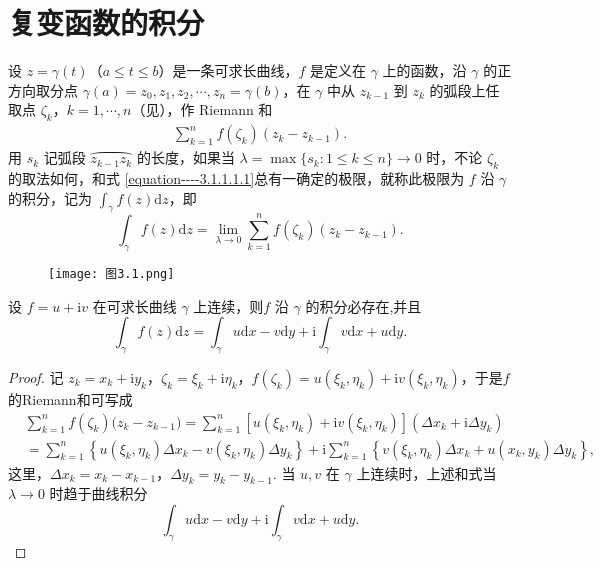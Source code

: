 \documentclass[../../main.tex]{subfiles}
\begin{document}
\section{复变函数的积分}

\begin{definition}
设 \( z = \gamma(t) \)（\( a \leqslant t \leqslant b \)）是一条可求长曲线，\( f \) 是定义在 \( \gamma \) 上的函数，沿 \( \gamma \) 的正方向取分点 \( \gamma(a) = z_0, z_1, z_2, \cdots, z_n = \gamma(b) \)，在 \( \gamma \) 中从 \( z_{k - 1} \) 到 \( z_k \) 的弧段上任取点 \( \zeta_k \)，\( k = 1, \cdots, n \)（见），作 Riemann 和
\begin{align}\label{equation----3.1.1.1.1}
\sum_{k = 1}^n f(\zeta_k)(z_k - z_{k - 1}). 
\end{align}
用 \( s_k \) 记弧段 \( \wideparen{z_{k - 1}z_k} \) 的长度，如果当 \( \lambda = \max\{s_k: 1 \leqslant k \leqslant n\} \to 0 \) 时，不论 \( \zeta_k \) 的取法如何，和式 \eqref{equation----3.1.1.1.1}总有一确定的极限，就称此极限为 \( f \) 沿 \( \gamma \) 的积分，记为 \( \int_\gamma f(z)\mathrm{d}z \)，即
\[
\int_\gamma f(z)\mathrm{d}z = \lim_{\lambda \to 0} \sum_{k = 1}^n f(\zeta_k)(z_k - z_{k - 1}).
\]
\end{definition}

\begin{figure}[H]
\centering
\texttt{[image: 图3.1.png]}
\caption{}
\label{figure:图3.1}
\end{figure}

\begin{proposition}\label{proposition:连续复变函数积分必存在}
设 \( f = u + \mathrm{i}v \) 在可求长曲线 \( \gamma \) 上连续，则\( f \) 沿 \( \gamma \) 的积分必存在,并且
\[
\int_\gamma f(z)\mathrm{d}z = \int_\gamma u \mathrm{d}x - v \mathrm{d}y + \mathrm{i}\int_\gamma v \mathrm{d}x + u \mathrm{d}y.
\]
\end{proposition}
\begin{proof}
记 \( z_k = x_k + \mathrm{i}y_k \)，\( \zeta_k = \xi_k + \mathrm{i}\eta_k \)，\( f(\zeta_k) = u(\xi_k, \eta_k) + \mathrm{i}v(\xi_k, \eta_k) \)，于是$f$的Riemann和可写成
\begin{align*}
&\sum_{k=1}^n{f(\zeta _k)(z_k}-z_{k-1})=\sum_{k=1}^n{\left[ u\left( \xi _k,\eta _k \right) +\mathrm{i}v\left( \xi _k,\eta _k \right) \right] \left( \Delta x_k+\mathrm{i}\Delta y_k \right)}
\\
&=\sum_{k=1}^n{\left\{ u(\xi _k,\eta _k)\Delta x_k-v(\xi _k,\eta _k)\Delta y_k \right\}}+\mathrm{i}\sum_{k=1}^n{\left\{ v(\xi _k,\eta _k)\Delta x_k+u(x_k,y_k)\Delta y_k \right\}},
\end{align*}
这里，\( \Delta x_k = x_k - x_{k - 1} \)，\( \Delta y_k = y_k - y_{k - 1} \). 当 \( u, v \) 在 \( \gamma \) 上连续时，上述和式当 \( \lambda \to 0 \) 时趋于曲线积分
\[
\int_\gamma u \mathrm{d}x - v \mathrm{d}y + \mathrm{i}\int_\gamma v \mathrm{d}x + u \mathrm{d}y.
\]

\end{proof}
\end{document}
